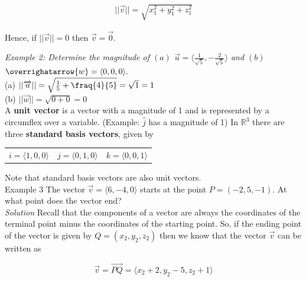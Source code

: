         \begin{align*}
            ||\overrightarrow{v}||=\sqrt{x_1^2+y_1^2+z_1^2}
        \end{align*}

        \noindent Hence, if $||\overrightarrow{v}||=0$ then $\overrightarrow{v}=\overrightarrow{0}.$

        \noindent\color{blue} \textit{Example 2: Determine the magnitude of
        $(a)$ $\overrightarrow{u}=\langle\frac{1}{\sqrt{5}},-\frac{2}{\sqrt{5}}\rangle$ and
        $(b)$ $\overrighatarrow{w}=\langle0,0,0\rangle.$} \color{black} \\
        (a) $||\overrightarrow{u}||=\sqrt{\frac{1}{5}+\fraq{4}{5}}=\sqrt{1}=1$\\
        (b) $||\overrightarrow{w}||=\sqrt{0+0}=0$\\

        \noindent A \textbf{unit vector} is a vector with a magnitude of 1 and is represented
        by a circumflex over a variable. (Example: $\hat{j}$ has a magnitude of 1) In
        $\mathbb{R}^3$ there are three \textbf{standard basis vectors}, given by

        \begin{center}
            \begin{tabular}{ccc}
                $i=\langle1,0,0\rangle$
                & $j=\langle0,1,0\rangle$
                & $k=\langle0,0,1\rangle$
            \end{tabular}
        \end{center}

        \noindent Note that standard basis vectors are also unit vectors.\\

        \noindent \color{blue} Example 3 \color{black} The vector
        $\overrightarrow{v}=\langle6,-4,0\rangle$ starts at the point $P=(-2,5,-1)$. At what
        point does the vector end?\\

        \noindent \emph{Solution} Recall that the components of a vector are always the coordinates of the
        terminal point minus the coordinates of the starting point. So, if the ending point of the
        vector is given by $Q=(x_2,y_2,z_2)$ then we know that the vector $\overrightarrow{v}$ can
        be written as

        \begin{equation*}
            \overrightarrow{v}=\overrightarrow{PQ}=\langle x_2+2,y_2-5,z_2+1\rangle
        \end{equation*}

